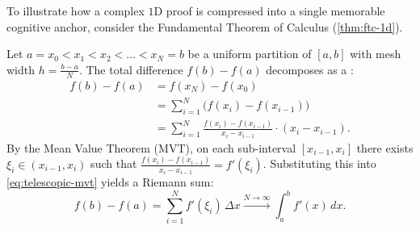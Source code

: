 \begin{math-stroke}
To illustrate how a complex $1\text{D}$ proof is compressed into a single memorable cognitive anchor, consider the Fundamental Theorem of Calculus (\cref{thm:ftc-1d}).

\begin{ai-tikz-planner-invisible-content}
\end{ai-tikz-planner-invisible-content}

\begin{center}
\end{center}

\begin{short-proof}
Let $a = x_0 < x_1 < x_2 < \dots < x_N = b$ be a uniform partition of $[a, b]$ with mesh width $h = \frac{b-a}{N}$. The total difference $f(b) - f(a)$ decomposes as a :
\begin{align}
f(b) - f(a) &= f(x_N) - f(x_0) \nonumber \\
&= \sum_{i=1}^N \bigl( f(x_i) - f(x_{i-1}) \bigr) \nonumber \\
&= \sum_{i=1}^N \frac{f(x_i) - f(x_{i-1})}{x_i - x_{i-1}} \cdot (x_i - x_{i-1}). \label{eq:telescopic-mvt}
\end{align}
By the Mean Value Theorem (MVT), on each sub-interval $[x_{i-1}, x_i]$ there exists $\xi_i \in (x_{i-1}, x_i)$ such that $\frac{f(x_i) - f(x_{i-1})}{x_i - x_{i-1}} = f'(\xi_i)$. Substituting this into \eqref{eq:telescopic-mvt} yields a Riemann sum:
\[
f(b) - f(a) = \sum_{i=1}^N f'(\xi_i) \, \Delta x \xrightarrow{N \to \infty} \int_a^b f'(x) \, dx.
\]
\end{short-proof}
\end{math-stroke}

